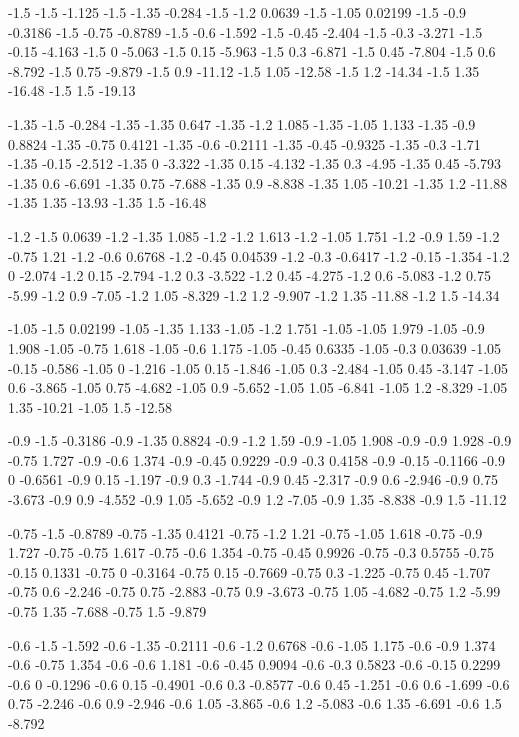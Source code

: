 -1.5 -1.5 -1.125
-1.5 -1.35 -0.284
-1.5 -1.2 0.0639
-1.5 -1.05 0.02199
-1.5 -0.9 -0.3186
-1.5 -0.75 -0.8789
-1.5 -0.6 -1.592
-1.5 -0.45 -2.404
-1.5 -0.3 -3.271
-1.5 -0.15 -4.163
-1.5 0 -5.063
-1.5 0.15 -5.963
-1.5 0.3 -6.871
-1.5 0.45 -7.804
-1.5 0.6 -8.792
-1.5 0.75 -9.879
-1.5 0.9 -11.12
-1.5 1.05 -12.58
-1.5 1.2 -14.34
-1.5 1.35 -16.48
-1.5 1.5 -19.13

-1.35 -1.5 -0.284
-1.35 -1.35 0.647
-1.35 -1.2 1.085
-1.35 -1.05 1.133
-1.35 -0.9 0.8824
-1.35 -0.75 0.4121
-1.35 -0.6 -0.2111
-1.35 -0.45 -0.9325
-1.35 -0.3 -1.71
-1.35 -0.15 -2.512
-1.35 0 -3.322
-1.35 0.15 -4.132
-1.35 0.3 -4.95
-1.35 0.45 -5.793
-1.35 0.6 -6.691
-1.35 0.75 -7.688
-1.35 0.9 -8.838
-1.35 1.05 -10.21
-1.35 1.2 -11.88
-1.35 1.35 -13.93
-1.35 1.5 -16.48

-1.2 -1.5 0.0639
-1.2 -1.35 1.085
-1.2 -1.2 1.613
-1.2 -1.05 1.751
-1.2 -0.9 1.59
-1.2 -0.75 1.21
-1.2 -0.6 0.6768
-1.2 -0.45 0.04539
-1.2 -0.3 -0.6417
-1.2 -0.15 -1.354
-1.2 0 -2.074
-1.2 0.15 -2.794
-1.2 0.3 -3.522
-1.2 0.45 -4.275
-1.2 0.6 -5.083
-1.2 0.75 -5.99
-1.2 0.9 -7.05
-1.2 1.05 -8.329
-1.2 1.2 -9.907
-1.2 1.35 -11.88
-1.2 1.5 -14.34

-1.05 -1.5 0.02199
-1.05 -1.35 1.133
-1.05 -1.2 1.751
-1.05 -1.05 1.979
-1.05 -0.9 1.908
-1.05 -0.75 1.618
-1.05 -0.6 1.175
-1.05 -0.45 0.6335
-1.05 -0.3 0.03639
-1.05 -0.15 -0.586
-1.05 0 -1.216
-1.05 0.15 -1.846
-1.05 0.3 -2.484
-1.05 0.45 -3.147
-1.05 0.6 -3.865
-1.05 0.75 -4.682
-1.05 0.9 -5.652
-1.05 1.05 -6.841
-1.05 1.2 -8.329
-1.05 1.35 -10.21
-1.05 1.5 -12.58

-0.9 -1.5 -0.3186
-0.9 -1.35 0.8824
-0.9 -1.2 1.59
-0.9 -1.05 1.908
-0.9 -0.9 1.928
-0.9 -0.75 1.727
-0.9 -0.6 1.374
-0.9 -0.45 0.9229
-0.9 -0.3 0.4158
-0.9 -0.15 -0.1166
-0.9 0 -0.6561
-0.9 0.15 -1.197
-0.9 0.3 -1.744
-0.9 0.45 -2.317
-0.9 0.6 -2.946
-0.9 0.75 -3.673
-0.9 0.9 -4.552
-0.9 1.05 -5.652
-0.9 1.2 -7.05
-0.9 1.35 -8.838
-0.9 1.5 -11.12

-0.75 -1.5 -0.8789
-0.75 -1.35 0.4121
-0.75 -1.2 1.21
-0.75 -1.05 1.618
-0.75 -0.9 1.727
-0.75 -0.75 1.617
-0.75 -0.6 1.354
-0.75 -0.45 0.9926
-0.75 -0.3 0.5755
-0.75 -0.15 0.1331
-0.75 0 -0.3164
-0.75 0.15 -0.7669
-0.75 0.3 -1.225
-0.75 0.45 -1.707
-0.75 0.6 -2.246
-0.75 0.75 -2.883
-0.75 0.9 -3.673
-0.75 1.05 -4.682
-0.75 1.2 -5.99
-0.75 1.35 -7.688
-0.75 1.5 -9.879

-0.6 -1.5 -1.592
-0.6 -1.35 -0.2111
-0.6 -1.2 0.6768
-0.6 -1.05 1.175
-0.6 -0.9 1.374
-0.6 -0.75 1.354
-0.6 -0.6 1.181
-0.6 -0.45 0.9094
-0.6 -0.3 0.5823
-0.6 -0.15 0.2299
-0.6 0 -0.1296
-0.6 0.15 -0.4901
-0.6 0.3 -0.8577
-0.6 0.45 -1.251
-0.6 0.6 -1.699
-0.6 0.75 -2.246
-0.6 0.9 -2.946
-0.6 1.05 -3.865
-0.6 1.2 -5.083
-0.6 1.35 -6.691
-0.6 1.5 -8.792

